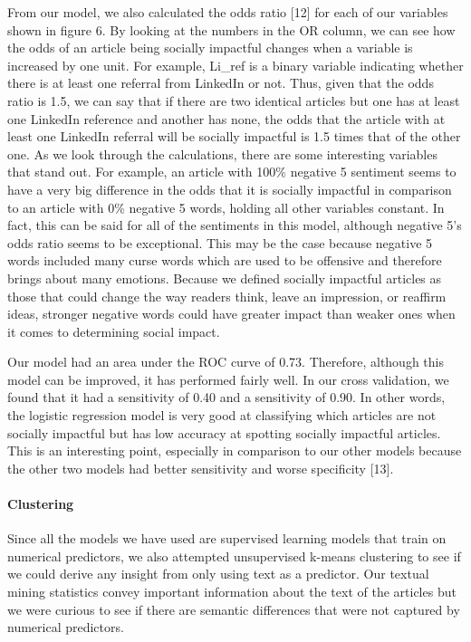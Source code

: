 \documentclass[10pt,letterpaper]{article}
\begin{document}
From our model, we also calculated the odds ratio {[}12{]} for each of
our variables shown in figure 6. By looking at the numbers in the OR
column, we can see how the odds of an article being socially impactful
changes when a variable is increased by one unit. For example, Li\_ref
is a binary variable indicating whether there is at least one referral
from LinkedIn or not. Thus, given that the odds ratio is 1.5, we can say
that if there are two identical articles but one has at least one
LinkedIn reference and another has none, the odds that the article with
at least one LinkedIn referral will be socially impactful is 1.5 times
that of the other one. As we look through the calculations, there are
some interesting variables that stand out. For example, an article with
100\% negative 5 sentiment seems to have a very big difference in the
odds that it is socially impactful in comparison to an article with 0\%
negative 5 words, holding all other variables constant. In fact, this
can be said for all of the sentiments in this model, although negative
5's odds ratio seems to be exceptional. This may be the case because
negative 5 words included many curse words which are used to be
offensive and therefore brings about many emotions. Because we defined
socially impactful articles as those that could change the way readers
think, leave an impression, or reaffirm ideas, stronger negative words
could have greater impact than weaker ones when it comes to determining
social impact.

Our model had an area under the ROC curve of 0.73. Therefore, although
this model can be improved, it has performed fairly well. In our cross
validation, we found that it had a sensitivity of 0.40 and a sensitivity
of 0.90. In other words, the logistic regression model is very good at
classifying which articles are not socially impactful but has low
accuracy at spotting socially impactful articles. This is an interesting
point, especially in comparison to our other models because the other
two models had better sensitivity and worse specificity {[}13{]}.

\paragraph{Clustering}\label{clustering}

Since all the models we have used are supervised learning models that
train on numerical predictors, we also attempted unsupervised k-means
clustering to see if we could derive any insight from only using text as
a predictor. Our textual mining statistics convey important information
about the text of the articles but we were curious to see if there are
semantic differences that were not captured by numerical predictors.
\end{document}
